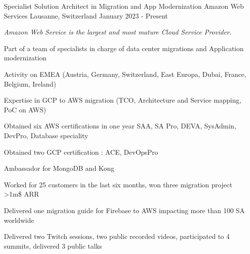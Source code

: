 \clearpage



\begin{cventries}
    \cventry
    {Specialist Solution Architect in Migration and App Modernization} %
    {Amazon Web Services} %
    {Lausanne, Switzerland} %
    {January 2023 - Present} %
    {
        \experience
            {
                \begin{cvitems} %
                    \item{\emph{Amazon Web Service is the largest and most mature Cloud Service Provider.}}
                    \item {Part of a team of specialists in charge of data center migrations and Application modernization }
                    \item {Activity on EMEA (Austria, Germany, Switzerland, East Europa, Dubai, France, Belgium, Ireland) }
                    \end{cvitems}
            }
            {
               \begin{cvitems} %
		\item {Expertise in GCP to AWS migration (TCO, Architecture and Service mapping, PoC on AWS)}
		\item {Obtained six AWS certifications in one year SAA, SA Pro, DEVA, SysAdmin, DevPro, Database speciality}
		\item {Obtained two GCP certification : ACE, DevOpsPro}
        \item {Ambassador for MongoDB and Kong}
		\item {Worked for 25 customers in the last six months, won three migration project >1m\$ ARR}
		\item {Delivered one migration guide for Firebase to AWS impacting more than 100 SA worldwide}
		\item {Delivered two Twitch sessions, two public recorded videos, participated to 4 summits, delivered 3 public talks}
               \end{cvitems}
}}
\end{cventries}
